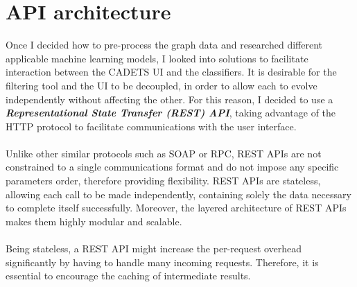 	\section{API architecture} \label{Section 2.3}
	Once I decided how to pre-process the graph data and researched different applicable machine learning models, I looked into solutions to facilitate interaction between the CADETS UI and the classifiers. It is desirable for the filtering tool and the UI to be decoupled, in order to allow each to evolve independently without affecting the other. For this reason, I decided to use a \textit{\textbf{Representational State Transfer (REST) API}}, taking advantage of the HTTP protocol to facilitate communications with the user interface.
	\\ \\
	Unlike other similar protocols such as SOAP or RPC, REST APIs are not constrained to a single communications format and do not impose any specific parameters order, therefore providing flexibility. REST APIs are stateless, allowing each call to be made independently, containing solely the data necessary to complete itself successfully. Moreover, the layered architecture of REST APIs makes them highly modular and scalable. 
	\\ \\
	Being stateless, a REST API might increase the per-request overhead significantly by having to handle many incoming requests. Therefore, it is essential to encourage the caching of intermediate results.
	
